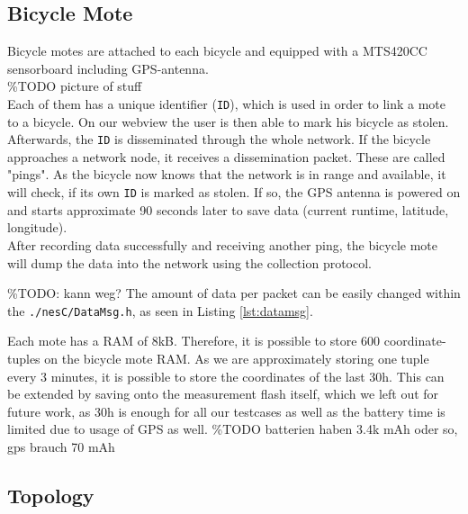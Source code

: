\documentclass[a4paper]{article}
\begin{document}
\subsection{Bicycle Mote}
Bicycle motes are attached to each bicycle and equipped with a MTS420CC sensorboard including GPS-antenna.\\
\%TODO picture of stuff\\
Each of them has a unique identifier (\texttt{ID}), which is used in order to link a mote to a bicycle. On our webview the user is then able to mark his bicycle as stolen. Afterwards, the \texttt{ID} is disseminated through the whole network. If the bicycle approaches a network node, it receives a dissemination packet. These are called "pings". As the bicycle now knows that the network is in range and available, it will check, if its own \texttt{ID} is marked as stolen. If so, the GPS antenna is powered on and starts approximate 90 seconds later to save data (current runtime, latitude, longitude).\\
After recording data successfully and receiving another ping, the bicycle mote will dump the data into the network using the collection protocol.

\%TODO: kann weg? The amount of data per packet can be easily changed within the \texttt{./nesC/DataMsg.h}, as seen in Listing \ref{lst:datamsg}.

Each mote has a RAM of 8kB. Therefore, it is possible to store 600 coordinate-tuples on the bicycle mote RAM. As we are approximately storing one tuple every 3 minutes, it is possible to store the coordinates of the last 30h. This can be extended by saving onto the measurement flash itself, which we left out for future work, as 30h is enough for all our testcases as well as the battery time is limited due to usage of GPS as well. \%TODO batterien haben 3.4k mAh oder so, gps brauch 70 mAh

\subsection{Topology}
\end{document}
